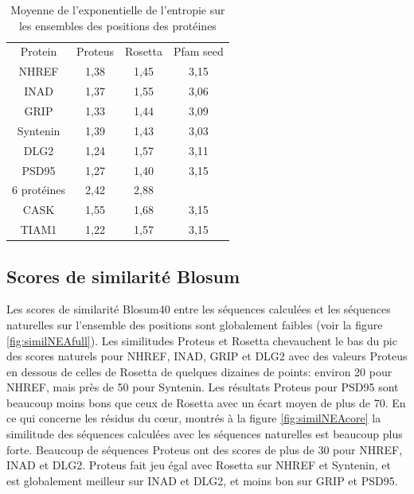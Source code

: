     \begin{table}[!htbp]
      \centering
      \caption{Moyenne de l'exponentielle de l'entropie sur les ensembles des positions des protéines}
      \label{tab:Entropie_PDZ}      
      \begin{tabular}{cccc}
        \toprule
        Protein & Proteus & Rosetta & Pfam seed \\
        \cmidrule{1-4}
        NHREF  & 1,38 & 1,45 & 3,15  \\
        INAD  & 1,37 & 1,55 & 3,06  \\
        GRIP  & 1,33 & 1,44 & 3,09  \\
        Syntenin  & 1,39 & 1,43 & 3,03  \\
        DLG2  & 1,24 & 1,57 & 3,11  \\
        PSD95  & 1,27 & 1,40 & 3,15  \\
        6 protéines & 2,42  & 2,88 &    \\
        \cmidrule{1-4}
        CASK  & 1,55 & 1,68 & 3,15  \\
        TIAM1 & 1,22 & 1,57 & 3,15  \\
        \bottomrule
      \end{tabular}      
    \end{table}
        
\subsection{Scores de similarité Blosum}

Les scores de similarité Blosum40 entre les séquences calculées et les séquences naturelles sur l'ensemble des positions sont globalement faibles (voir la figure \ref{fig:similNEAfull}). Les similitudes Proteus et Rosetta chevauchent le bas du pic des scores naturels pour NHREF, INAD, GRIP et DLG2 avec des valeurs Proteus en dessous de celles de Rosetta de quelques dizaines de points: environ 20 pour NHREF, mais près de 50 pour Syntenin. Les résultats Proteus pour PSD95 sont beaucoup moins bons que ceux de Rosetta avec un écart moyen de plus de 70. En ce qui concerne les résidus du cœur, montrés à la figure  \ref{fig:similNEAcore} la similitude des séquences calculées avec les séquences naturelles est beaucoup plus forte. Beaucoup de séquences Proteus ont des scores de plus de 30 pour NHREF, INAD et DLG2. Proteus fait jeu égal avec Rosetta sur NHREF et Syntenin, et est globalement meilleur sur INAD et DLG2, et moins bon sur GRIP et PSD95. 


